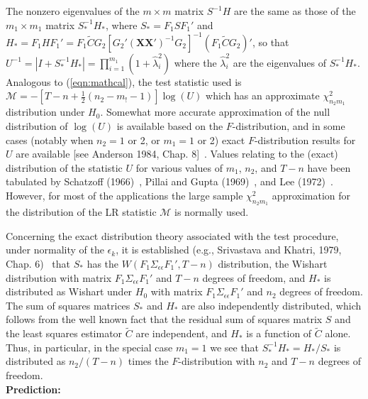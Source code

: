 The nonzero eigenvalues of the $m\times m$ matrix $S^{-1}H$ are the same as those of the $m_1 \times m_1$ matrix $S_*^{-1}H_*$, where $S_*=F_1SF_1'$ and $H_*=F_1HF_1'=F_1\tilde{C}G_2[G_2'(\mathbf{X}\mathbf{X}')^{-1}G_2]^{-1}(F_1\tilde{C}G_2)'$, so that $U^{-1}=|I+S_*^{-1}H_*|=\prod_{i=1}^{m_1}(1+\hat{\lambda}_i^2)$ where the $\hat{\lambda}_i^2$ are the eigenvalues of $S_*^{-1}H_*$. Analogous to (\ref{eqn:mathcal}), the test statistic used is $\mathcal{M}=-[T-n+\frac{1}{2}(n_2-m_!-1)]\log(U)$ which has an approximate $\chi_{n_2m_1}^2$ distribution under $H_0$. Somewhat more accurate approximation of the null distribution of $\log(U)$ is available based on the $F$-distribution, and in some cases (notably when $n_2=1$ or 2, or $m_1=1$ or 2) exact $F$-distribution results for $U$ are available [see Anderson 1984, Chap. 8]~\cite{andersontw2}. Values relating to the (exact) distribution of the statistic $U$ for various values of $m_1$, $n_2$, and $T-n$ have been tabulated by Schatzoff (1966)~\cite{schatzoff}, Pillai and Gupta (1969)~\cite{pilgup}, and Lee (1972)~\cite{leewilks}. However, for most of the applications the large sample $\chi_{n_2m_1}^2$ approximation for the distribution of the LR statistic $\mathcal{M}$ is normally used.


Concerning the exact distribution theory associated with the test procedure, under normality of the $\epsilon_k$, it is established (e.g., Srivastava and Khatri, 1979, Chap. 6)~\cite{srivkhat} that $S_*$ has the $W(F_1\Sigma_{\epsilon\epsilon}F_1',T-n)$ distribution, the Wishart distribution with matrix $F_1\Sigma_{\epsilon\epsilon}F_1'$ and $T-n$ degrees of freedom, and $H_*$ is distributed as Wishart under $H_0$ with matrix $F_1\Sigma_{\epsilon\epsilon}F_1'$ and $n_2$ degrees of freedom. The sum of squares matrices $S_*$ and $H_*$ are also independently distributed, which follows from the well known fact that the residual sum of squares matrix $S$ and the least squares estimator $\tilde{C}$ are independent, and $H_*$ is a function of $\tilde{C}$ alone. Thus, in particular, in the special case $m_1=1$ we see that $S_*^{-1}H_*=H_*/S_*$ is distributed as $n_2/(T-n)$ times the $F$-distribution with $n_2$ and $T-n$ degrees of freedom. \\


\noindent \textbf{Prediction:} \\

